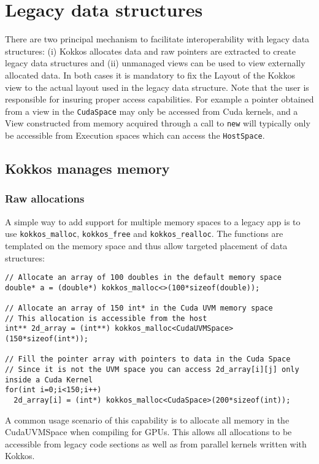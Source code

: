 \section{Legacy data structures}

There are two principal mechanism to facilitate interoperability with legacy data 
structures: (i) Kokkos allocates data and raw pointers are extracted to create 
legacy data structures and (ii) unmanaged views can be used to view externally 
allocated data. In both cases it is mandatory to fix the Layout of the Kokkos view
to the actual layout used in the legacy data structure. Note that the user is responsible
for insuring proper access capabilities. For example a pointer obtained from a view
in the \lstinline|CudaSpace| may only be accessed from Cuda kernels, and a View
constructed from memory acquired through a call to \lstinline|new| will typically only 
be accessible from Execution spaces which can access the \lstinline|HostSpace|.

\subsection{Kokkos manages memory}

\subsubsection{Raw allocations}

A simple way to add support for multiple memory spaces to a legacy app is to 
use \lstinline|kokkos_malloc|, \lstinline|kokkos_free| and \lstinline|kokkos_realloc|.
The functions are templated on the memory space and thus allow targeted 
placement of data structures: 

\begin{lstlisting}
// Allocate an array of 100 doubles in the default memory space
double* a = (double*) kokkos_malloc<>(100*sizeof(double)); 

// Allocate an array of 150 int* in the Cuda UVM memory space
// This allocation is accessible from the host
int** 2d_array = (int**) kokkos_malloc<CudaUVMSpace>(150*sizeof(int*));

// Fill the pointer array with pointers to data in the Cuda Space
// Since it is not the UVM space you can access 2d_array[i][j] only inside a Cuda Kernel
for(int i=0;i<150;i++)
  2d_array[i] = (int*) kokkos_malloc<CudaSpace>(200*sizeof(int));
\end{lstlisting}

A common usage scenario of this capability is to allocate all memory in the CudaUVMSpace 
when compiling for GPUs. This allows all allocations to be accessible from legacy code sections
as well as from parallel kernels written with Kokkos. 

